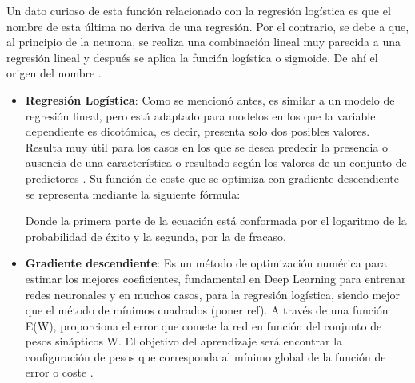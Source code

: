 \begin{itemize}
\begin{itemize}
		Un dato curioso de esta función relacionado con la regresión logística es que el nombre de esta última no deriva de una regresión. Por el contrario, se debe a que, al principio de la neurona, se realiza una combinación lineal muy parecida a una regresión lineal y después se aplica la función logística o sigmoide. De ahí el origen del nombre \parencite{gl_iartificial2019reglogistica}.
		\begin{itemize}
			\item \textbf{Regresión Logística}: Como se mencionó antes, es similar a un modelo de regresión lineal, pero está adaptado para modelos en los que la variable dependiente es dicotómica, es decir, presenta solo dos posibles valores. Resulta muy útil para los casos en los que se desea predecir la presencia o ausencia de una característica o resultado según los valores de un conjunto de predictores \parencite{gl_ibm2019reglogistica}. Su función de coste que se optimiza con gradiente descendiente se representa mediante la siguiente fórmula:
			
			Donde la primera parte de la ecuación está conformada por el logaritmo de la probabilidad de éxito y la segunda, por la de fracaso.
			
			\item \textbf{Gradiente descendiente}: Es un método de optimización numérica para estimar los mejores coeficientes, fundamental en Deep Learning para entrenar redes neuronales y en muchos casos, para la regresión logística, siendo mejor que el método de mínimos cuadrados (poner ref). A través de una función E(W), proporciona el error que comete la red en función del conjunto de pesos sinápticos W. El objetivo del aprendizaje será encontrar la configuración de pesos que corresponda al mínimo global de la función de error o coste \parencite{tec_bertona2005algevol}.
			

\end{itemize}
\end{itemize}
\end{itemize}
